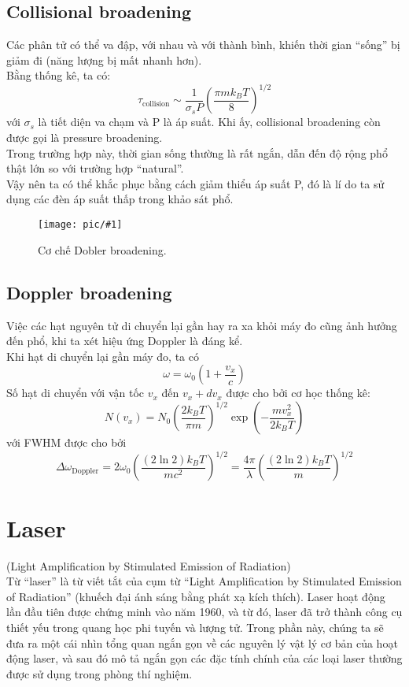\documentclass{article}
\newcommand{\image}[2]{
	\begin{figure}[h!]
		\centering
		\texttt{[image: pic/\#1]}
		\caption{#2}
	\end{figure}
}
\begin{document}
\subsection{Collisional broadening}
Các phân tử có thể va đập, với nhau và với thành bình, khiến thời gian ``sống'' bị giảm đi (năng lượng bị mất nhanh hơn).\\
Bằng thống kê, ta có: $$\tau_{\text{collision}} \sim \frac{1}{\sigma_s P} \left( \frac{\pi m k_B T}{8} \right)^{1/2}$$ với $\sigma_s$ là tiết diện va chạm và P là áp suất. Khi ấy, collisional broadening còn được gọi là pressure broadening.\\
Trong trường hợp này, thời gian sống thường là rất ngắn, dẫn đến độ rộng phổ thật lớn so với trường hợp ``natural''.\\
Vậy nên ta có thể khắc phục bằng cách giảm thiểu áp suất P, đó là lí do ta sử dụng các đèn áp suất thấp trong khảo sát phổ.\\
\image{pbroad.png}{Cơ chế Dobler broadening.}
\subsection{Doppler broadening}
Việc các hạt nguyên tử di chuyển lại gần hay ra xa khỏi máy đo cũng ảnh hưởng đến phổ, khi ta xét hiệu ứng Doppler là đáng kể. \\
Khi hạt di chuyển lại gần máy đo, ta có $$\omega=\omega_0\left(1+\frac{v_x}{c}\right)$$
Số hạt di chuyển với vận tốc $v_x$ đến $v_x+dv_x$ được cho bởi cơ học thống kê: $$N(v_x) = N_0 \left( \frac{2k_B T}{\pi m} \right)^{1/2} \exp \left( -\frac{m v_x^2}{2k_B T} \right)$$ với FWHM được cho bởi $$\Delta \omega_{\text{Doppler}} = 2 \omega_0 \left( \frac{(2 \ln 2) k_B T}{mc^2} \right)^{1/2} = \frac{4 \pi}{\lambda} \left( \frac{(2 \ln 2) k_B T}{m} \right)^{1/2}$$

\section{Laser}(Light Amplification by
 Stimulated Emission of Radiation) \\
Từ ``laser'' là từ viết tắt của cụm từ ``Light Amplification by Stimulated Emission of Radiation'' (khuếch đại ánh sáng bằng phát xạ kích thích). Laser hoạt động lần đầu tiên được chứng minh vào năm 1960, và từ đó, laser đã trở thành công cụ thiết yếu trong quang học phi tuyến và lượng tử. Trong phần này, chúng ta sẽ đưa ra một cái nhìn tổng quan ngắn gọn về các nguyên lý vật lý cơ bản của hoạt động laser, và sau đó mô tả ngắn gọn các đặc tính chính của các loại laser thường được sử dụng trong phòng thí nghiệm.
\end{document}
